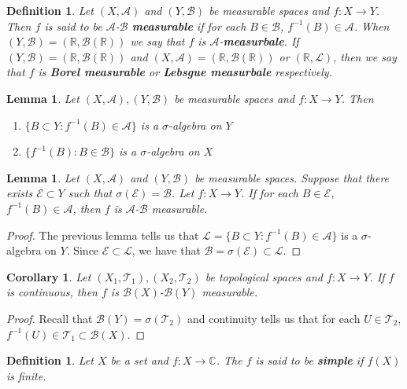 \documentclass[12pt]{amsart}
\newtheorem{lem}[thm]{Lemma}
\newtheorem{cor}[thm]{Corollary}
\newtheorem{defn}[thm]{Definition}
\newcommand{\sig}{\sigma}
\newcommand{\C}{\mathbb{C}}
\newcommand{\R}{\mathbb{R}}
\newcommand{\MA}{\mathcal{A}}
\newcommand{\MB}{\mathcal{B}}
\newcommand{\ML}{\mathcal{L}}
\newcommand{\ME}{\mathcal{E}}
\newcommand{\MT}{\mathcal{T}}
\begin{document}
\begin{defn}
Let $(X,\MA)$ and $(Y, \MB)$ be measurable spaces and $f:X \rightarrow Y$. Then $f$ is said to be $\MA$-$\MB$ \textbf{measurable} if for each $B \in \MB$, $f^{-1}(B) \in \MA$. When $(Y, \MB) = (\R, \MB(\R))$ we say that $f$ is $\MA$-\textbf{measurbale}. If $(Y,\MB) = (\R, \MB(\R))$ and $(X,\MA) = (\R, \MB(\R))$ or $(\R, \ML)$, then we say that $f$ is \textbf{Borel measurable} or \textbf{Lebsgue measurbale} respectively.
\end{defn}

\begin{lem}
Let $(X,\MA), (Y,\MB)$ be measurable spaces and $f: X \rightarrow Y$. Then 
\begin{enumerate}
\item $\{B \subset Y: f^{-1}(B) \in \MA\}$ is a $\sig$-algebra on $Y$
\item $\{f^{-1}(B): B \in \MB\}$ is a $\sig$-algebra on $X$
\end{enumerate}
\end{lem}

\begin{lem}
Let $(X,\MA)$ and $(Y, \MB)$ be measurable spaces. Suppose that there exists $\ME \subset Y$ such that $\sig(\ME) = \MB$. Let $f:X \rightarrow Y$. If for each $B \in \ME$, $f^{-1}(B) \in \MA$, then $f$ is $\MA$-$\MB$ measurable.
\end{lem}

\begin{proof}
The previous lemma tells us that $\ML = \{B \subset Y: f^{-1}(B) \in \MA\}$ is a $\sig$-algebra on $Y$. Since $\ME \subset \ML$, we have that $\MB = \sig(\ME) \subset \ML$.
\end{proof}

\begin{cor}
Let $(X_1,\MT_1), (X_2,\MT_2)$ be topological spaces and $f: X \rightarrow Y$. If $f$ is continuous, then $f$ is $\MB(X)$-$\MB(Y)$ measurable.
\end{cor}

\begin{proof}
Recall that $\MB(Y) = \sig(\MT_2)$ and continuity tells us that for each $U \in \MT_2$, $f^{-1}(U) \in \MT_1 \subset \MB(X)$. 
\end{proof}

\begin{defn}
Let $X$ be a set and $f:X \rightarrow \C$. The $f$ is said to be \textbf{simple} if $f(X)$ is finite.
\end{defn}
\end{document}
